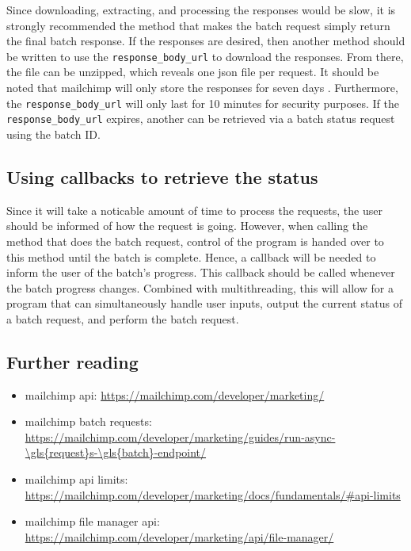 \documentclass[11pt]{article}
\begin{document}
Since downloading, extracting, and processing the \gls{response}s would be slow, it is strongly recommended the method that makes the \gls{batch} \gls{request} simply return the final \gls{batch} \gls{response}. If the \gls{response}s are desired, then another method should be written to use the \texttt{response\_body\_url} to download the \gls{response}s. From there, the file can be unzipped, which reveals one \acrshort{json} file per \gls{request}. It should be noted that \Gls{mailchimp} will only store the \gls{response}s for seven days \cite{mailchimp-batch}. Furthermore, the \texttt{\gls{response}\_body\_url} will only last for 10 minutes for security purposes. If the \texttt{response\_body\_url} expires, another can be retrieved via a \gls{batch} status \gls{request} using the \gls{batch} ID.

\subsection{Using callbacks to retrieve the status}

Since it will take a noticable amount of time to process the \gls{request}s, the \gls{user} should be informed of how the \gls{request} is going. However, when calling the method that does the \gls{batch} \gls{request}, control of the program is handed over to this method until the \gls{batch} is complete. Hence, a callback will be needed to inform the user of the \gls{batch}'s progress. This callback should be called whenever the \gls{batch} progress changes. Combined with multithreading, this will allow for a program that can simultaneously handle user inputs, output the current status of a \gls{batch} \gls{request}, and perform the \gls{batch} \gls{request}.

\subsection{Further reading}

\begin{itemize}
    \item \Gls{mailchimp} \acrshort{api}: \url{https://mailchimp.com/developer/marketing/}
    \item \Gls{mailchimp} \gls{batch} \gls{request}s: \url{https://mailchimp.com/developer/marketing/guides/run-async-\gls{request}s-\gls{batch}-endpoint/}
    \item \Gls{mailchimp} \acrshort{api} limits: \url{https://mailchimp.com/developer/marketing/docs/fundamentals/#api-limits}
    \item \Gls{mailchimp} file manager \acrshort{api}: \url{https://mailchimp.com/developer/marketing/api/file-manager/}
\end{itemize}
\end{document}
